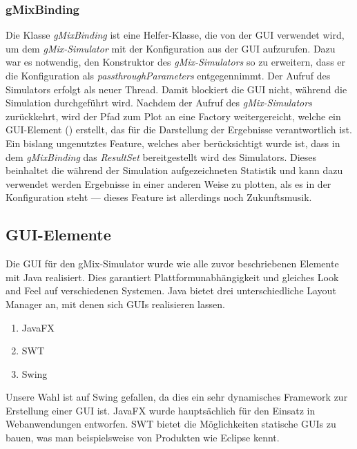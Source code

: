 \documentclass[a4paper, 11pt]{article} %
\begin{document}

\subsubsection{gMixBinding} %
\label{ssub:gmixbinding}
Die Klasse \emph{gMixBinding} ist eine Helfer-Klasse, die von der GUI verwendet wird, um dem \emph{gMix-Simulator} mit der Konfiguration aus der GUI aufzurufen. Dazu war es notwendig, den Konstruktor des \emph{gMix-Simulators} so zu erweitern, dass er die Konfiguration als \emph{passthroughParameters} entgegennimmt. Der Aufruf des Simulators erfolgt als neuer Thread. Damit blockiert die GUI nicht, während die Simulation durchgeführt wird. Nachdem der Aufruf des \emph{gMix-Simulators} zurückkehrt, wird der Pfad zum Plot an eine Factory weitergereicht, welche ein GUI-Element (\emph{}) erstellt, das für die Darstellung der Ergebnisse verantwortlich ist.\\

Ein bislang ungenutztes Feature, welches aber berücksichtigt wurde ist, dass in dem \emph{gMixBinding} das \emph{ResultSet} bereitgestellt wird des Simulators. Dieses beinhaltet die während der Simulation aufgezeichneten Statistik und kann dazu verwendet werden Ergebnisse in einer anderen Weise zu plotten, als es in der Konfiguration steht --- dieses Feature ist allerdings noch Zukunftsmusik.\\

\subsection{GUI-Elemente}
Die GUI für den gMix-Simulator wurde wie alle zuvor beschriebenen Elemente mit Java realisiert. Dies garantiert Plattformunabhängigkeit und gleiches Look and Feel auf verschiedenen Systemen. Java bietet drei unterschiedliche Layout Manager an, mit denen sich GUIs realisieren lassen.
\begin{enumerate}
\item JavaFX
\item SWT
\item Swing
\end{enumerate}
Unsere Wahl ist auf Swing gefallen, da dies ein sehr dynamisches Framework zur Erstellung einer GUI ist. JavaFX wurde hauptsächlich für den Einsatz in Webanwendungen entworfen. SWT bietet die Möglichkeiten statische GUIs zu bauen, was man beispielsweise von Produkten wie  Eclipse kennt.\\
\end{document}
